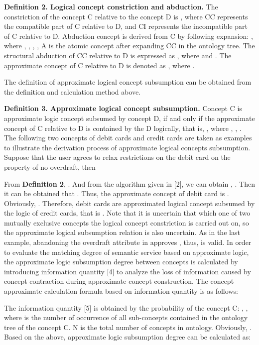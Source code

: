\documentclass{ieeeaccess}
\begin{document}
\textbf{Definition 2. Logical concept constriction and abduction.} The constriction of the concept C relative to the concept D is  , where CC represents the compatible part of C relative to D, and CI represents the incompatible part of C relative to D. Abduction concept   is derived from C by following expansion:  , where  ,  ,  ,  , A is the atomic concept after expanding CC in the ontology tree. The structural abduction of CC relative to D is expressed as  , where   and  . The approximate concept of C relative to D is denoted as  , where  .

The definition of approximate logical concept subsumption can be obtained from the definition and calculation method above.

\textbf{Definition 3. Approximate logical concept subsumption.} Concept C is approximate logic concept subsumed by concept D, if and only if the approximate concept of C relative to D is contained by the D logically, that is,  , where  ,  ,  . The following two concepts of debit cards and credit cards are taken as examples to illustrate the derivation process of approximate logical concepts subsumption. Suppose that the user agrees to relax restrictions on the debit card on the property of no overdraft, then
 
From \textbf{Definition 2},  . And from the algorithm given in [2], we can obtain ,  . Then it can be obtained that . Thus, the approximate concept of debit card is  . Obviously,  . Therefore, debit cards are approximated logical concept subsumed by the logic of credit cards, that is  .
Note that it is uncertain that which one of two mutually exclusive concepts the logical concept constriction is carried out on, so the approximate logical subsumption relation is also uncertain. As in the last example, abandoning the overdraft attribute in   approves , thus,   is valid.
In order to evaluate the matching degree of semantic service based on approximate logic, the approximate logic subsumption degree between concepts is calculated by introducing information quantity [4] to analyze the loss of information caused by concept contraction during approximate concept construction. The concept approximate calculation formula based on information quantity is as follows:
 
The information quantity  [5] is obtained by the probability of the concept C:  ,  , where   is the number of occurrence of all sub-concepts contained in the ontology tree of the concept C. N is the total number of concepts in ontology. Obviously,  . Based on the above, approximate logic subsumption degree can be calculated as: 
 
\end{document}
